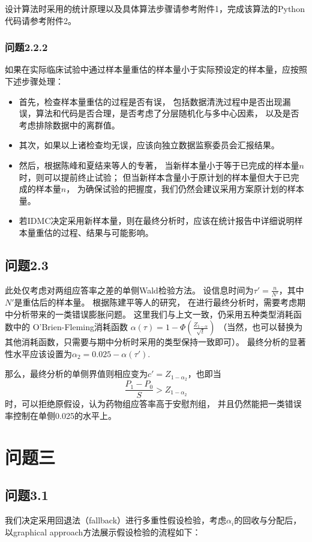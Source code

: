 \documentclass{article}
\begin{document}
设计算法时采用的统计原理以及具体算法步骤请参考附件1，完成该算法的Python代码请参考附件2。

\subsubsection{问题2.2.2}
如果在实际临床试验中通过样本量重估的样本量小于实际预设定的样本量，应按照下述步骤处理：
\begin{itemize}
    \item 首先，检查样本量重估的过程是否有误，
        包括数据清洗过程中是否出现漏误，算法和代码是否合理，是否考虑了分层随机化与多中心因素，
        以及是否考虑排除数据中的离群值。
    \item 其次，如果以上诸检查均无误，应该向独立数据监察委员会汇报结果。
    \item 然后，根据陈峰和夏结来等人的专著\cite{陈峰2018临床试验统计学}，
        当新样本量小于等于已完成的样本量$n$时，则可以提前终止试验；
        但当新样本含量小于原计划的样本量但大于已完成的样本量$n$，
        为确保试验的把握度，我们仍然会建议采用方案原计划的样本量。
    \item 若IDMC决定采用新样本量，则在最终分析时，应该在统计报告中详细说明样本量重估的过程、结果与可能影响。
\end{itemize}

\subsection{问题2.3}
此处仅考虑对两组应答率之差的单侧Wald检验方法。
设信息时间为$\tau' = \frac{n}{N'}$，其中$N'$是重估后的样本量。
根据陈建平等人的研究\cite{陈建平2010期中分析的条件把握度及样本含量再估计}，
在进行最终分析时，需要考虑期中分析带来的一类错误膨胀问题。
这里我们与上文一致，仍采用五种类型消耗函数中的
O'Brien-Fleming消耗函数
$\alpha(\tau)=1-\Phi(\frac{Z_{1-\alpha}}{\sqrt{t}})$
（当然，也可以替换为其他消耗函数，只需要与期中分析时采用的类型保持一致即可）。
最终分析的显著性水平应该设置为$\alpha_2 = 0.025-\alpha(\tau')$.

那么，最终分析的单侧界值则相应变为$c' = Z_{1-\alpha_2}$，也即当
\[ \frac{P_1-P_0}{S}>Z_{1-\alpha_2}\]时，可以拒绝原假设，认为药物组应答率高于安慰剂组，
并且仍然能把一类错误率控制在单侧0.025的水平上。


\section{问题三}
\subsection{问题3.1}
我们决定采用回退法（fallback）进行多重性假设检验，考虑$\alpha_i$的回收与分配后，
以graphical approach方法展示假设检验的流程如下：
\end{document}
